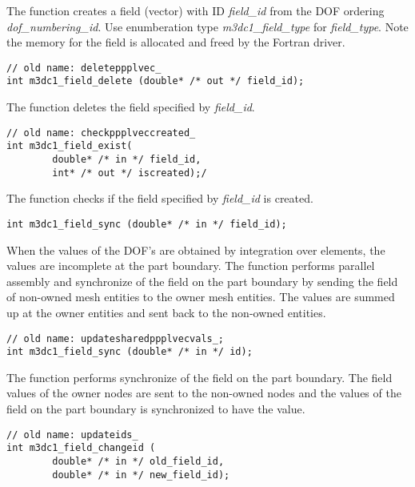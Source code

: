 The function creates a field (vector) with ID \textit{field\_id} from the DOF ordering \textit{dof\_numbering\_id}. Use enumberation type \emph{m3dc1\_field\_type} for \textit{field\_type}. Note the  memory for the field is allocated and freed by the Fortran driver.

\begin{verbatim}
// old name: deleteppplvec_
int m3dc1_field_delete (double* /* out */ field_id); 
\end{verbatim}\vspace{-.5cm}\hspace{1cm}

The function deletes the field specified by \textit{field\_id}.

\begin{verbatim}
// old name: checkppplveccreated_
int m3dc1_field_exist(
        double* /* in */ field_id, 
        int* /* out */ iscreated);/
\end{verbatim}\vspace{-.5cm}\hspace{1cm}

The function checks if the field specified by \textit{field\_id} is created.

\begin{verbatim}
int m3dc1_field_sync (double* /* in */ field_id); 
\end{verbatim}\vspace{-.5cm}\hspace{1cm}

When the values of the DOF's are obtained by  integration over elements, the values are incomplete at the part boundary. The function performs parallel assembly and synchronize of the field on the part boundary by sending the field of non-owned mesh entities to the owner mesh entities. The values are summed up at the owner entities and sent back to the non-owned entities.  

\begin{verbatim}
// old name: updatesharedppplvecvals_;
int m3dc1_field_sync (double* /* in */ id); 
\end{verbatim}\vspace{-.5cm}\hspace{1cm}

The function performs synchronize of the field on the part boundary. The field values of the owner nodes are sent to the non-owned nodes and the values of the field on the part boundary is synchronized to have the value.  

\begin{verbatim}
// old name: updateids_
int m3dc1_field_changeid (
        double* /* in */ old_field_id, 
        double* /* in */ new_field_id); 
\end{verbatim}\vspace{-.5cm}\hspace{1cm}

